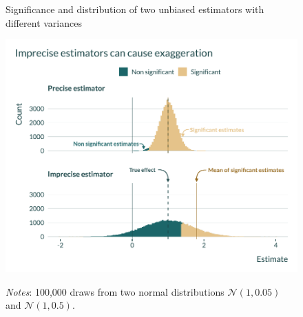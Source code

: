 			   \begin{figure}[!h]
				\begin{center}
					\caption{Significance and distribution of two unbiased estimators with different variances}
					\label{fig:graph_exag}
					\includegraphics[width=0.8\linewidth]{images/graph_intuition_precision.pdf}
					\caption*{\footnotesize \textit{Notes}: 100,000 draws from two normal distributions $\mathcal{N}(1, 0.05)$ and $\mathcal{N}(1, 0.5)$.}
				\end{center}
				\vspace{-1cm}
			 \end{figure}
			
